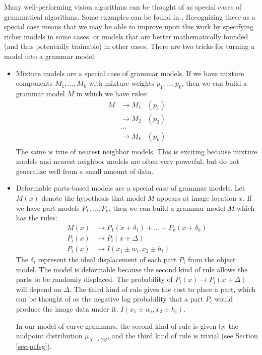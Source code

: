 Many well-performing vision algorithms can be thought of as special
cases of grammatical algorithms. Some examples can be found in
\cite{pop, pictorial, grammar-tr}. Recognizing these as a special case
means that we may be able to improve upon this work by specifying
richer models in some cases, or models that are better mathematically
founded (and thus potentially trainable) in other cases. There are two
tricks for turning a model into a grammar model:
\begin{itemize}
\item Mixture models are a special case of grammar models. If we have
  mixture components $M_1,\dots,M_k$ with mixture weights
  $p_1,\dots,p_k$, then we can build a grammar model $M$ in which we
  have rules:
  \begin{align*}
    M &\to M_1 &(p_1)\\
     &\to M_2 &(p_2)\\
     &\dots&\\
     &\to M_k &(p_k)\\
  \end{align*}
  The same is true of nearest neighbor models. This is exciting
  because mixture models and nearest neighbor models are often very
  powerful, but do not generalize well from a small amount of data.

\item Deformable parts-based models are a special case of grammar
  models. Let $M(x)$ denote the hypothesis that model $M$ appears at
  image location $x$. If we have part models $P_1,\dots,P_k$, then we
  can build a grammar model $M$ which has the rules:
  \begin{align*}
M(x) &\to P_1(x + \delta_1) + \dots + P_k(x + \delta_k)\\
P_i(x) &\to P_i(x+\Delta)\\
P_i(x) &\to I(x_1 \pm w_i, x_2 \pm h_i)
  \end{align*}
  The $\delta_i$ represent the ideal displacement of each part $P_i$
  from the object model. The model is deformable because the second
  kind of rule allows the parts to be randomly displaced. The
  probability of $P_i(x) \to P_i(x+\Delta)$ will depend on
  $\Delta$. The third kind of rule gives the cost to place a part,
  which can be thought of as the negative log probability that a part
  $P_i$ would produce the image data under it, $I(x_1\pm w_i, x_2\pm
  h_i)$.

  In our model of curve grammars, the second kind of rule is given
  by the midpoint distribution $\mu_{X\to YZ}$, and the third kind of
  rule is trivial (see Section \ref{sec-pcfsg}).
\end{itemize}

